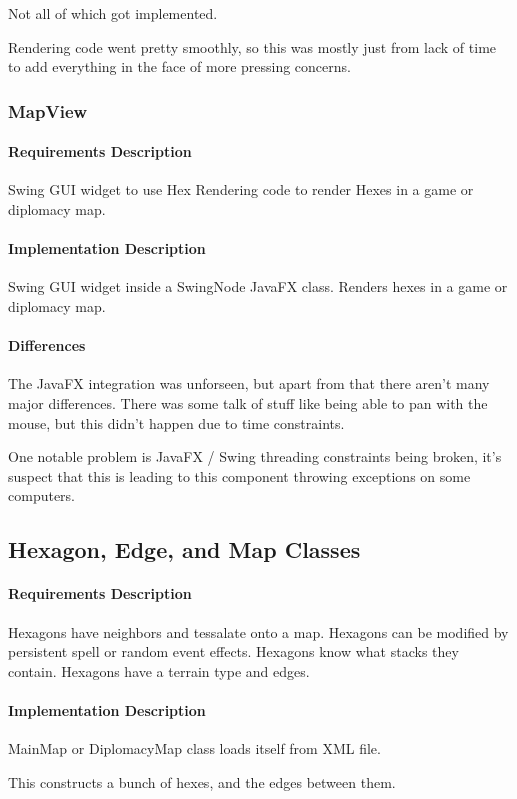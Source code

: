 \documentclass[12pt,a4paper,titlepage]{article}
\begin{document}
Not all of which got implemented.

Rendering code went pretty smoothly, so this was
mostly just from lack of time to add everything in the face of
more pressing concerns.

\subsubsection{MapView}
\paragraph{Requirements Description} 
Swing GUI widget to use Hex Rendering code to render Hexes in a game or diplomacy map.
\paragraph{Implementation Description}
Swing GUI widget inside a SwingNode JavaFX class. Renders hexes in a game or diplomacy map.
\paragraph{Differences}
The JavaFX integration was unforseen, but apart from that there aren't many major differences.
There was some talk of stuff like being able to pan with the mouse, but this didn't happen
due to time constraints.

One notable problem is JavaFX / Swing threading constraints being broken,
it's suspect that this is leading to this component throwing exceptions
on some computers.


\subsection{Hexagon, Edge, and Map Classes} 
\paragraph{Requirements Description}
Hexagons have neighbors and tessalate onto a map.
Hexagons can be modified by persistent spell or
random event effects.
Hexagons know what stacks they contain.
Hexagons have a terrain type and edges.

\paragraph{Implementation Description}
MainMap or DiplomacyMap class loads itself from XML file.

This constructs a bunch of hexes, and the edges between them.
\end{document}
